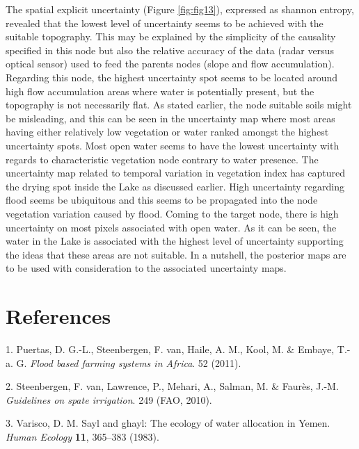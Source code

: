 \documentclass[12pt,oneside]{article}
\begin{document}
The spatial explicit uncertainty (Figure \ref{fig:fig13}), expressed as shannon entropy, revealed that the lowest level of uncertainty seems to be achieved with the suitable topography. This may be explained by the simplicity of the causality specified in this node but also the relative accuracy of the data (radar versus optical sensor) used to feed the parents nodes (slope and flow accumulation). Regarding this node, the highest uncertainty spot seems to be located around high flow accumulation areas where water is potentially present, but the topography is not necessarily flat. As stated earlier, the node suitable soils might be misleading, and this can be seen in the uncertainty map where most areas having either relatively low vegetation or water ranked amongst the highest uncertainty spots. Most open water seems to have the lowest uncertainty with regards to characteristic vegetation node contrary to water presence. The uncertainty map related to temporal variation in vegetation index has captured the drying spot inside the Lake as discussed earlier. High uncertainty regarding flood seems be ubiquitous and this seems to be propagated into the node vegetation variation caused by flood. Coming to the target node, there is high uncertainty on most pixels associated with open water. As it can be seen, the water in the Lake is associated with the highest level of uncertainty supporting the ideas that these areas are not suitable. In a nutshell, the posterior maps are to be used with consideration to the associated uncertainty maps.

\clearpage

\hypertarget{references}{%
\section*{References}\label{references}}

\hypertarget{refs}{}
\leavevmode\hypertarget{ref-Puertas_et_al_2011}{}%
1. Puertas, D. G.-L., Steenbergen, F. van, Haile, A. M., Kool, M. \& Embaye, T.-a. G. \emph{Flood based farming systems in Africa}. 52 (2011).

\leavevmode\hypertarget{ref-VanSteenbergen_et_al_2010}{}%
2. Steenbergen, F. van, Lawrence, P., Mehari, A., Salman, M. \& Faurès, J.-M. \emph{Guidelines on spate irrigation}. 249 (FAO, 2010).

\leavevmode\hypertarget{ref-Varisco_1983}{}%
3. Varisco, D. M. Sayl and ghayl: The ecology of water allocation in Yemen. \emph{Human Ecology} \textbf{11}, 365--383 (1983).
\end{document}
